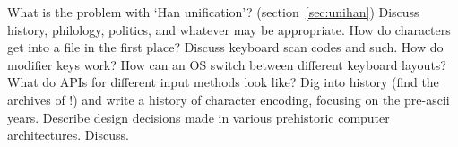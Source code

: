 
%
\project
  What is the problem with `Han unification'?
  (section~\ref{sec:unihan}) Discuss history, philology, politics, and whatever
  may be appropriate.
%
\project How do characters get into a file in the first place? Discuss
keyboard scan codes and such. How do modifier keys work?
How can an OS switch between different
keyboard layouts? What do APIs for different input methods look like?
%
\project Dig into history (find the
  archives of !) and write a history of
  character encoding, focusing on the pre-ascii years. Describe
  design decisions made in various prehistoric computer
  architectures. Discuss.
